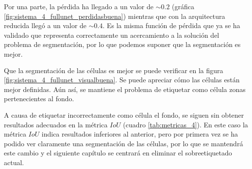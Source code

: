 

Por una parte, la pérdida ha llegado a un valor de $\sim 0.2$ (gráfica \ref{fig:sistema_4_fullunet_perdidasbuena}) mientras que con la arquitectura reducida llegó a un valor de $\sim 0.4$. Es la misma función de pérdida que ya se ha validado que representa correctamente un acercamiento a la solución del problema de segmentación, por lo que podemos suponer que la segmentación es mejor.

Que la segmentación de las células es mejor se puede verificar en la figura \ref{fig:sistema_4_fullunet_visualbuena}. Se puede apreciar cómo las células están mejor definidas. Aún así, se mantiene el problema de etiquetar como célula zonas pertenecientes al fondo.

A causa de etiquetar incorrectamente como célula el fondo, se siguen sin obtener resultados adecuados en la métrica $IoU$ (cuadro \ref{tab:metricas_4}). En este caso la métrica $IoU$ indica resultados inferiores al anterior, pero por primera vez se ha podido ver claramente una segmentación de las células, por lo que se mantendrá este cambio y el siguiente capítulo se centrará en eliminar el sobreetiquetado actual.